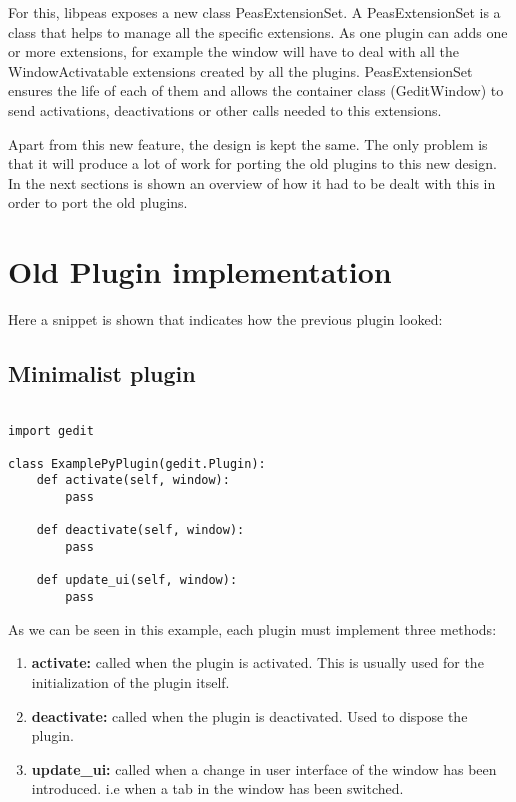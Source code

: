 For this, libpeas exposes a new class PeasExtensionSet. A PeasExtensionSet is a class that helps to manage all the specific extensions. As one plugin can adds one or more extensions, for example the window will have to deal with all the WindowActivatable extensions created by all the plugins. PeasExtensionSet ensures the life of each of them and allows the container class (GeditWindow) to send activations, deactivations or other calls needed to this extensions.

Apart from this new feature, the design is kept the same. The only problem is that it will produce a lot of work 
for porting the old plugins to this new design. In the next sections is shown an overview of how it had to be dealt 
with this in order to port the old plugins.

\newpage
\section{Old Plugin implementation}

Here a snippet is shown that indicates how the previous plugin looked:

\subsection{Minimalist plugin}

\begin{lstlisting}[style=python]

import gedit

class ExamplePyPlugin(gedit.Plugin):
    def activate(self, window):
        pass

    def deactivate(self, window):
        pass

    def update_ui(self, window):
        pass

\end{lstlisting}

As we can be seen in this example, each plugin must implement three methods:
\begin{enumerate}
  \item \textbf{activate:} called when the plugin is activated. This is usually used for the initialization of the plugin itself.
  \item \textbf{deactivate:} called when the plugin is deactivated. Used to dispose the plugin.
  \item \textbf{update\_ui:} called when a change in user interface of the window has been introduced. i.e when a tab in the window has been switched.
\end{enumerate}

